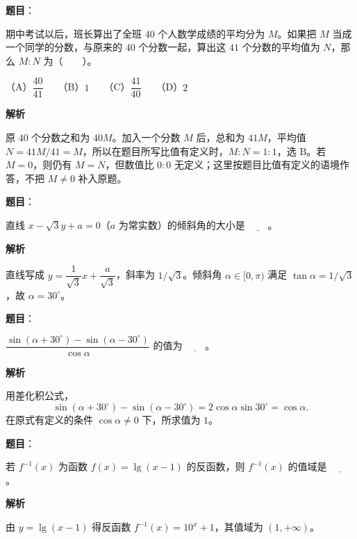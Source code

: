 \begin{answer}

\textbf{题目}：

期中考试以后，班长算出了全班 $40$ 个人数学成绩的平均分为 $M$。如果把 $M$ 当成一个同学的分数，与原来的 $40$ 个分数一起，算出这 $41$ 个分数的平均值为 $N$，那么 $M:N$ 为\mbox{（　　）}。

（A）$\dfrac{40}{41}$　　（B）$1$　　（C）$\dfrac{41}{40}$　　（D）$2$

\textbf{解析}

原 $40$ 个分数之和为 $40M$。加入一个分数 $M$ 后，总和为 $41M$，平均值 $N=41M/41=M$，所以在题目所写比值有定义时，$M:N=1:1$，选 B。若 $M=0$，则仍有 $M=N$，但数值比 $0:0$ 无定义；这里按题目比值有定义的语境作答，不把 $M\ne0$ 补入原题。


\end{answer}
\begin{answer}

\textbf{题目}：

直线 $x-\sqrt3y+a=0$（$a$ 为常实数）的倾斜角的大小是 $\underline{\qquad}$。

\textbf{解析}

直线写成 $y=\dfrac1{\sqrt3}x+\dfrac a{\sqrt3}$，斜率为 $1/\sqrt3$。倾斜角 $\alpha\in[0,\pi)$ 满足 $\tan\alpha=1/\sqrt3$，故 $\alpha=30^\circ$。


\end{answer}
\begin{answer}

\textbf{题目}：

$\dfrac{\sin(\alpha+30^\circ)-\sin(\alpha-30^\circ)}{\cos\alpha}$ 的值为 $\underline{\qquad}$。

\textbf{解析}

用差化积公式，
\nopagebreak[4]
\[
\sin(\alpha+30^\circ)-\sin(\alpha-30^\circ)
=2\cos\alpha\sin30^\circ=\cos\alpha.
\]
在原式有定义的条件 $\cos\alpha\ne0$ 下，所求值为 $1$。


\end{answer}
\begin{answer}

\textbf{题目}：

若 $f^{-1}(x)$ 为函数 $f(x)=\lg(x-1)$ 的反函数，则 $f^{-1}(x)$ 的值域是 $\underline{\qquad}$。

\textbf{解析}

由 $y=\lg(x-1)$ 得反函数 $f^{-1}(x)=10^x+1$，其值域为 $(1,+\infty)$。


\end{answer}
